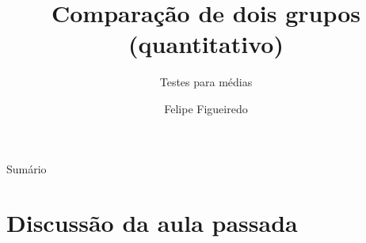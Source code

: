 \documentclass{beamer}
\title%
{Comparação de dois grupos (quantitativo)}
\subtitle
{Testes para médias} %
\author%
{Felipe Figueiredo}%
\institute[INTO] %
{Instituto Nacional de Traumatologia e Ortopedia
}
\date%
{}
\begin{document}
\begin{frame}
  \titlepage
\end{frame}

\begin{frame}{Sumário}
  \tableofcontents
\end{frame}








\section{Discussão da aula passada}
\end{document}

